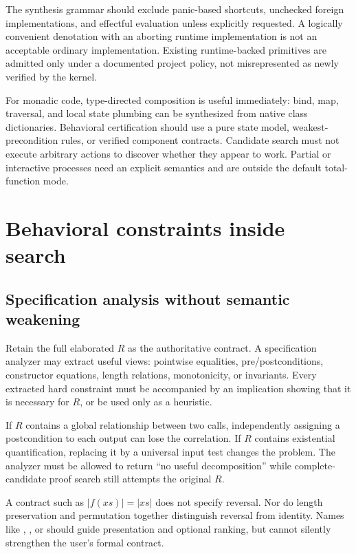 \documentclass[11pt,a4paper]{article}
\newcommand{\code}[1]{\texttt{\detokenize{#1}}}
\theoremstyle{remark}
\begin{document}
The synthesis grammar should exclude panic-based shortcuts, unchecked foreign implementations, and effectful evaluation unless explicitly requested. A logically convenient denotation with an aborting runtime implementation is not an acceptable ordinary implementation. Existing runtime-backed primitives are admitted only under a documented project policy, not misrepresented as newly verified by the kernel.

For monadic code, type-directed composition is useful immediately: bind, map, traversal, and local state plumbing can be synthesized from native class dictionaries. Behavioral certification should use a pure state model, weakest-precondition rules, or verified component contracts. Candidate search must not execute arbitrary \code{IO} actions to discover whether they appear to work. Partial or interactive processes need an explicit semantics and are outside the default total-function mode.

\section{Behavioral constraints inside search}\label{sec:behavior}

\subsection{Specification analysis without semantic weakening}

Retain the full elaborated $R$ as the authoritative contract. A specification analyzer may extract useful views: pointwise equalities, pre/postconditions, constructor equations, length relations, monotonicity, or invariants. Every extracted hard constraint must be accompanied by an implication showing that it is necessary for $R$, or be used only as a heuristic.

If $R$ contains a global relationship between two calls, independently assigning a postcondition to each output can lose the correlation. If $R$ contains existential quantification, replacing it by a universal input test changes the problem. The analyzer must be allowed to return ``no useful decomposition'' while complete-candidate proof search still attempts the original $R$.

A contract such as $|f(xs)|=|xs|$ does not specify reversal. Nor do length preservation and permutation together distinguish reversal from identity. Names like \code{reverse}, \code{sort}, or \code{normalize} should guide presentation and optional ranking, but cannot silently strengthen the user's formal contract.
\end{document}
